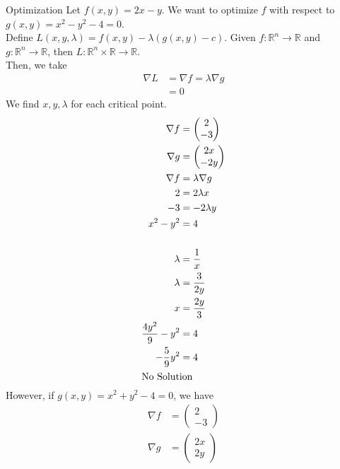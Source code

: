 \documentclass[8pt]{extarticle}
\newcommand{\R}{\mathbb{R}}
\begin{document}
  \begin{problem}{Optimization}
    Let $f(x,y) = 2x -y$. We want to optimize $f$ with respect to $g(x,y) = x^2 - y^2 - 4 = 0$.\\

    Define $L(x,y,\lambda) = f(x,y) - \lambda(g(x,y)-c)$. Given $f: \R^n \rightarrow \R$ and $g: \R^n \rightarrow \R$, then $L: \R^n\times \R \rightarrow \R$.\\

    Then, we take
    \begin{align*}
      \nabla L &= \nabla f = \lambda \nabla g\\
               &= 0 \tag*{critical points of $L$}
    \end{align*}
    We find $x,y,\lambda$ for each critical point.
    \begin{align*}
      \nabla f &= \begin{pmatrix}2\\-3\end{pmatrix}\\
      \nabla g &= \begin{pmatrix}2x\\-2y\end{pmatrix}\\
      \nabla f &= \lambda \nabla g\\
      2 &= 2\lambda x\\
      -3 &= -2\lambda y\\
      x^2 -y^2 &= 4\\
      \\
      \lambda &= \frac{1}{x}\\
      \lambda &= \frac{3}{2y}\\
      x &= \frac{2y}{3}\\
      \frac{4y^2}{9} - y^2 &= 4\\
      -\frac{5}{9}y^2 &= 4\\
      \shortintertext{No Solution}
    \end{align*}
    However, if $g(x,y) = x^2 + y^2 - 4 = 0$, we have
    \begin{align*}
      \nabla f &= \begin{pmatrix}2\\-3\end{pmatrix}\\
      \nabla g &= \begin{pmatrix}2x\\2y\end{pmatrix}\\

\end{align*}
\end{problem}
\end{document}
